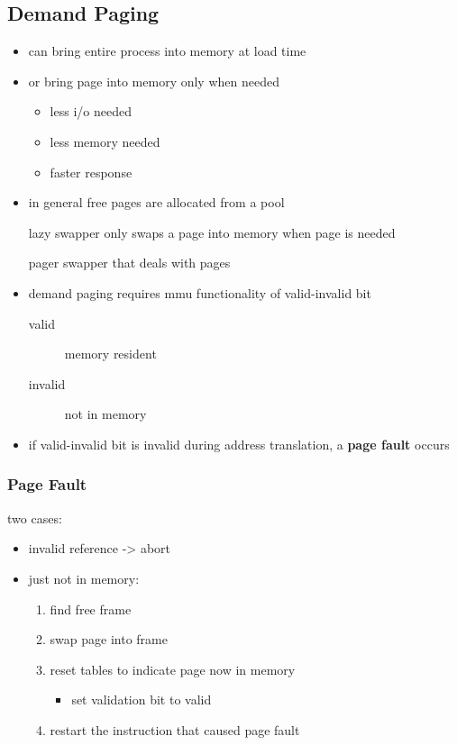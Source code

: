 \documentclass[11pt]{article}
\begin{document}
\subsection{Demand Paging}
\label{sec:org71b3748}
\begin{itemize}
\item can bring entire process into memory at load time
\item or bring page into memory only when needed
\begin{itemize}
\item less i/o needed
\item less memory needed
\item faster response
\end{itemize}
\item in general free pages are allocated from a pool
\item[{lazy swapper}] only swaps a page into memory when page is needed
\item[{pager}] swapper that deals with pages
\item demand paging requires mmu functionality of valid-invalid bit
\begin{description}
\item[{valid}] memory resident
\item[{invalid}] not in memory
\end{description}
\item if valid-invalid bit is invalid during address translation, a \textbf{page fault} occurs
\end{itemize}
\subsubsection{Page Fault}
\label{sec:orga36483a}
two cases:
\begin{itemize}
\item invalid reference -> abort
\item just not in memory:
\begin{enumerate}
\item find free frame
\item swap page into frame
\item reset tables to indicate page now in memory
\begin{itemize}
\item set validation bit to valid
\end{itemize}
\item restart the instruction that caused page fault
\end{enumerate}
\end{itemize}
\end{document}
